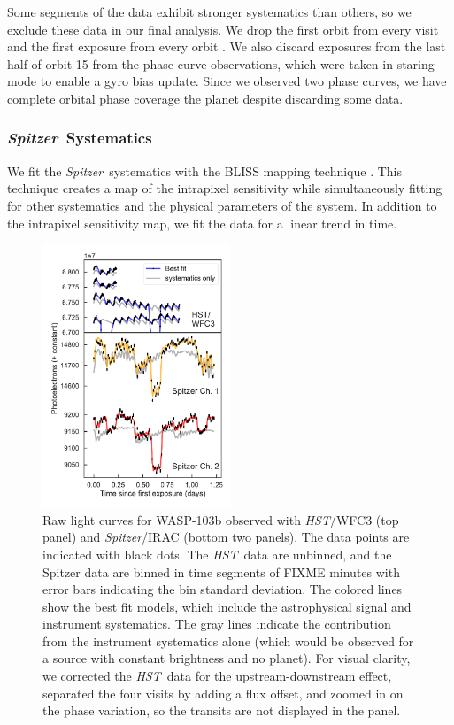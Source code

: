 \documentclass[twocolumn]{aastex61}
\newcommand{\project}[1]{\textsl{#1}}
\newcommand{\HST}{\project{HST}}
\newcommand{\Spitzer}{\project{Spitzer}}
\begin{document}
Some segments of the data exhibit stronger systematics than others, so we exclude these data in our final analysis. We drop the first orbit from every visit and the first exposure from every orbit \citep[following common practice; see e.g.][]{kreidberg14a}.  We also discard exposures from the last half of orbit 15 from the phase curve observations, which were taken in staring mode to enable a gyro bias update. Since we observed two phase curves, we have complete orbital phase coverage the planet despite discarding some data.

\subsubsection{\Spitzer\ Systematics}
We fit the \Spitzer\ systematics with the BLISS mapping technique \citep{stevenson12}. This technique creates a map of the intrapixel sensitivity while simultaneously fitting for other systematics and the physical parameters of the system. In addition to the intrapixel sensitivity map, we fit the data for a linear trend in time. 

\begin{figure}
\includegraphics[width = 0.5\textwidth]{Figures/systematics.pdf}
\caption{Raw light curves for WASP-103b observed with \HST/WFC3 (top panel) and \Spitzer/IRAC (bottom two panels). The data points are indicated with black dots. The \HST\ data are unbinned, and the Spitzer data are binned in time segments of FIXME minutes with error bars indicating the bin standard deviation. The colored lines show the best fit models, which include the astrophysical signal and instrument systematics. The gray lines indicate the contribution from the instrument systematics alone (which would be observed for a source with constant brightness and no planet). For visual clarity, we corrected the \HST\ data for the upstream-downstream effect, separated the four visits by adding a flux offset, and zoomed in on the phase variation, so the transits are not displayed in the panel.}
\label{fig:systematics}
\end{figure}
\end{document}
